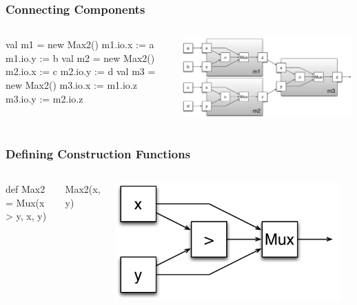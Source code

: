 \documentclass[xcolor=pdflatex,dvipsnames,table]{beamer}
\begin{document}
\begin{frame}[fragile]
\frametitle{Connecting Components}

\begin{columns}
\begin{scala}
val m1 = new Max2()
m1.io.x := a
m1.io.y := b
val m2 = new Max2()
m2.io.x := c
m2.io.y := d
val m3 = new Max2()
m3.io.x := m1.io.z
m3.io.y := m2.io.z
\end{scala}


\begin{center}
\includegraphics[width=0.99\textwidth]{figs/Max4.pdf} \\
\end{center}
\end{columns}

\end{frame}


\begin{frame}[fragile]
\frametitle{Defining Construction Functions}

\begin{columns}


\begin{scala}
def Max2 = Mux(x > y, x, y)
\end{scala}
\begin{scala}
Max2(x, y)
\end{scala}


\begin{center}
\includegraphics[width=0.95\textwidth]{figs/Max2.pdf} \\[1cm]
\end{center}

\end{columns}

\end{frame}
\end{document}
